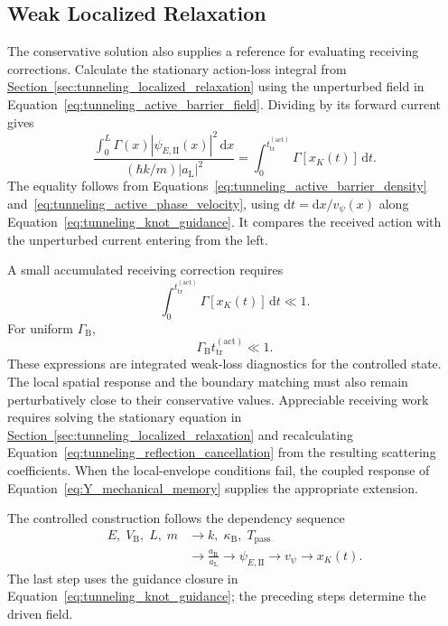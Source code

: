 \subsection{Weak Localized Relaxation}

The conservative solution also supplies a reference for evaluating receiving corrections. Calculate the stationary action-loss integral from \hyperref[sec:tunneling_localized_relaxation]{Section~\ref*{sec:tunneling_localized_relaxation}} using the unperturbed field in Equation~\eqref{eq:tunneling_active_barrier_field}. Dividing by its forward current gives
\begin{equation}
    \frac{\displaystyle\int_0^L
    \Gamma(x)|\psi_{E,\mathrm{II}}(x)|^2\,\mathrm dx}
    {(\hbar k/m)|a_{\mathrm L}|^2}
    =\int_0^{t_{\mathrm{tr}}^{(\mathrm{act})}}
    \Gamma[x_K(t)]\,\mathrm dt.
\end{equation}
The equality follows from Equations~\eqref{eq:tunneling_active_barrier_density} and~\eqref{eq:tunneling_active_phase_velocity}, using $\mathrm dt=\mathrm dx/v_\psi(x)$ along Equation~\eqref{eq:tunneling_knot_guidance}. It compares the received action with the unperturbed current entering from the left.

A small accumulated receiving correction requires
\begin{equation}
    \boxed{
    \int_0^{t_{\mathrm{tr}}^{(\mathrm{act})}}
    \Gamma[x_K(t)]\,\mathrm dt\ll1
    }.
    \label{eq:tunneling_active_weak_relaxation}
\end{equation}
For uniform $\Gamma_{\mathrm B}$,
\begin{equation}
    \boxed{
    \Gamma_{\mathrm B}t_{\mathrm{tr}}^{(\mathrm{act})}\ll1
    }.
    \label{eq:tunneling_active_uniform_relaxation}
\end{equation}
These expressions are integrated weak-loss diagnostics for the controlled state. The local spatial response and the boundary matching must also remain perturbatively close to their conservative values. Appreciable receiving work requires solving the stationary equation in \hyperref[sec:tunneling_localized_relaxation]{Section~\ref*{sec:tunneling_localized_relaxation}} and recalculating Equation~\eqref{eq:tunneling_reflection_cancellation} from the resulting scattering coefficients. When the local-envelope conditions fail, the coupled response of Equation~\eqref{eq:Y_mechanical_memory} supplies the appropriate extension.

The controlled construction follows the dependency sequence
\begin{equation}
    \begin{aligned}
    E,\;V_{\mathrm B},\;L,\;m
    &\longrightarrow k,\;\kappa_{\mathrm B},\;T_{\mathrm{pass}}\\
    &\longrightarrow\frac{a_{\mathrm R}}{a_{\mathrm L}}
    \longrightarrow\psi_{E,\mathrm{II}}
    \longrightarrow v_\psi
    \longrightarrow x_K(t).
    \end{aligned}
    \label{eq:tunneling_active_engineering_hierarchy}
\end{equation}
The last step uses the guidance closure in Equation~\eqref{eq:tunneling_knot_guidance}; the preceding steps determine the driven field.

